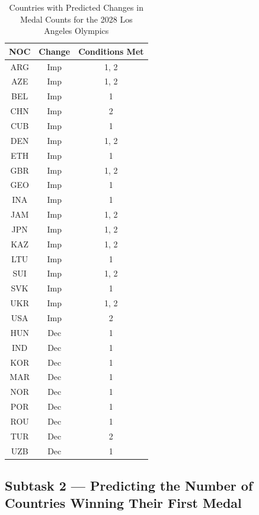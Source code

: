 \documentclass{mcmthesis}
\begin{document}
\begin{table}[htbp]
    \centering
    \begin{tabular}{|c|c|c|}
        \hline
        NOC & Change & Conditions Met \\
        \hline
        ARG & Imp & 1, 2 \\
        AZE & Imp & 1, 2 \\
        BEL & Imp & 1 \\
        CHN & Imp & 2 \\
        CUB & Imp & 1 \\
        DEN & Imp & 1, 2 \\
        ETH & Imp & 1 \\
        GBR & Imp & 1, 2 \\
        GEO & Imp & 1 \\
        INA & Imp & 1 \\
        JAM & Imp & 1, 2 \\
        JPN & Imp & 1, 2 \\
        KAZ & Imp & 1, 2 \\
        LTU & Imp & 1 \\
        SUI & Imp & 1, 2 \\
        SVK & Imp & 1 \\
        UKR & Imp & 1, 2 \\
        USA & Imp & 2 \\
        HUN & Dec & 1 \\
        IND & Dec & 1 \\
        KOR & Dec & 1 \\
        MAR & Dec & 1 \\
        NOR & Dec & 1 \\
        POR & Dec & 1 \\
        ROU & Dec & 1 \\
        TUR & Dec & 2 \\
        UZB & Dec & 1 \\
        \hline
    \end{tabular}
    \caption{Countries with Predicted Changes in Medal Counts for the 2028 Los Angeles Olympics}
    \label{tab:medal_changes}
\end{table}








\subsection{Subtask 2 --- Predicting the Number of Countries Winning Their First Medal}
\end{document}
